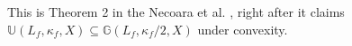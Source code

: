 \documentclass[12pt]{report}
\begin{document}
            \begin{remark}
                This is Theorem 2 in the Necoara et al. \cite{necoara_linear_2019}, right after it claims $\mathbb U(L_f, \kappa_f, X)\subseteq \mathbb G(L_f, \kappa_f/2, X)$ under convexity. 
            \end{remark}
            \begin{theorem}\label{thm:qfg-suff}
                
            \end{theorem}
            \begin{theorem}
                
            \end{theorem}

        






\end{document}
